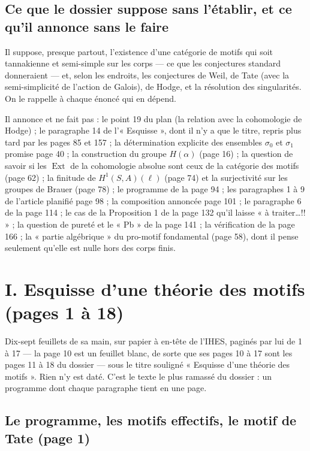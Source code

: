\documentclass[11pt,a4paper]{article}
\begin{document}
\subsection*{Ce que le dossier suppose sans l'établir, et ce qu'il annonce sans
le faire}

Il suppose, presque partout, l'existence d'une catégorie de motifs qui soit
tannakienne et semi-simple sur les corps --- ce que les conjectures standard
donneraient --- et, selon les endroits, les conjectures de Weil, de Tate (avec
la semi-simplicité de l'action de Galois), de Hodge, et la résolution des
singularités. On le rappelle à chaque énoncé qui en dépend.

Il annonce et ne fait pas : le point 19 du plan (la relation avec la
cohomologie de Hodge) ; le paragraphe 14 de l'« Esquisse », dont il n'y a que
le titre, repris plus tard par les pages 85 et 157 ; la détermination explicite
des ensembles $\sigma_{0}$ et $\sigma_{1}$ promise page 40 ; la construction du
groupe $H(\alpha)$ (page 16) ; la question de savoir si les $\operatorname{Ext}$
de la cohomologie absolue sont ceux de la catégorie des motifs (page 62) ; la
finitude de $H^{1}(S, A)(\ell)$ (page 74) et la surjectivité sur les groupes de
Brauer (page 78) ; le programme de la page 94 ; les paragraphes 1 à 9 de
l'article planifié page 98 ; la composition annoncée page 101 ; le paragraphe 6
de la page 114 ; le cas de la Proposition 1 de la page 132 qu'il laisse « à
traiter…!! » ; la question de pureté et le « Pb » de la page 141 ; la
vérification de la page 166 ; la « partie algébrique » du pro-motif
fondamental (page 58), dont il pense seulement qu'elle est nulle hors des corps
finis.

\section*{I. Esquisse d'une théorie des motifs (pages 1 à 18)}

Dix-sept feuillets de sa main, sur papier à en-tête de l'IHES, paginés par lui
de 1 à 17 --- la page 10 est un feuillet blanc, de sorte que ses pages 10 à 17
sont les pages 11 à 18 du dossier --- sous le titre souligné « Esquisse d'une
théorie des motifs ». Rien n'y est daté. C'est le texte le plus ramassé du
dossier : un programme dont chaque paragraphe tient en une page.

\subsection*{Le programme, les motifs effectifs, le motif de Tate (page 1)}
\end{document}
